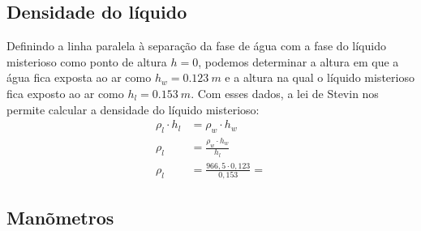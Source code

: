 \subsection{Densidade do líquido}
Definindo a linha paralela à separação da fase de água com a fase do líquido misterioso como ponto de altura \(h = 0\), podemos determinar a altura em que a água fica exposta ao ar como \(h_w = \qty{0,123}{m}\) e a altura na qual o líquido misterioso fica exposto ao ar como \(h_l = \qty{0,153}{m}\). Com esses dados, a lei de Stevin nos permite calcular a densidade do líquido misterioso:
\begin{align*}
    \rho_l \cdot h_l &= \rho_w \cdot h_w\\
    \rho_l &= \frac{\rho_w \cdot h_w}{h_l}\\
    \rho_l &= \frac{966,5 \cdot 0,123}{0,153} =  
\end{align*}
\subsection{Manõmetros}
